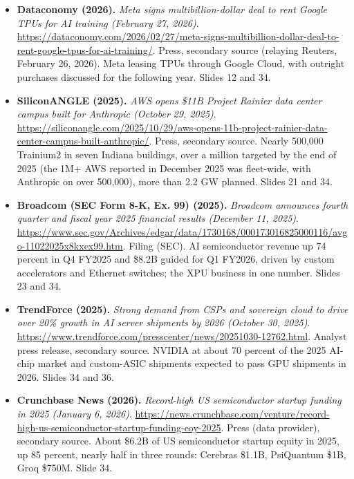 \documentclass[11pt,letterpaper]{article}
\begin{document}
\begin{itemize}[leftmargin=1.2em,itemsep=3pt]
\item \textbf{Dataconomy (2026).} \textit{Meta signs multibillion-dollar deal to rent Google TPUs for AI training (February 27, 2026)}. \url{https://dataconomy.com/2026/02/27/meta-signs-multibillion-dollar-deal-to-rent-google-tpus-for-ai-training/}. Press, secondary source (relaying Reuters, February 26, 2026). Meta leasing TPUs through Google Cloud, with outright purchases discussed for the following year. Slides 12 and 34.
\item \textbf{SiliconANGLE (2025).} \textit{AWS opens \$11B Project Rainier data center campus built for Anthropic (October 29, 2025)}. \url{https://siliconangle.com/2025/10/29/aws-opens-11b-project-rainier-data-center-campus-built-anthropic/}. Press, secondary source. Nearly 500,000 Trainium2 in seven Indiana buildings, over a million targeted by the end of 2025 (the 1M+ AWS reported in December 2025 was fleet-wide, with Anthropic on over 500,000), more than 2.2 GW planned. Slides 21 and 34.
\item \textbf{Broadcom (SEC Form 8-K, Ex. 99) (2025).} \textit{Broadcom announces fourth quarter and fiscal year 2025 financial results (December 11, 2025)}. \url{https://www.sec.gov/Archives/edgar/data/1730168/000173016825000116/avgo-11022025x8kxex99.htm}. Filing (SEC). AI semiconductor revenue up 74 percent in Q4 FY2025 and \$8.2B guided for Q1 FY2026, driven by custom accelerators and Ethernet switches; the XPU business in one number. Slides 23 and 34.
\item \textbf{TrendForce (2025).} \textit{Strong demand from CSPs and sovereign cloud to drive over 20\% growth in AI server shipments by 2026 (October 30, 2025)}. \url{https://www.trendforce.com/presscenter/news/20251030-12762.html}. Analyst press release, secondary source. NVIDIA at about 70 percent of the 2025 AI-chip market and custom-ASIC shipments expected to pass GPU shipments in 2026. Slides 34 and 36.
\item \textbf{Crunchbase News (2026).} \textit{Record-high US semiconductor startup funding in 2025 (January 6, 2026)}. \url{https://news.crunchbase.com/venture/record-high-us-semiconductor-startup-funding-eoy-2025}. Press (data provider), secondary source. About \$6.2B of US semiconductor startup equity in 2025, up 85 percent, nearly half in three rounds: Cerebras \$1.1B, PsiQuantum \$1B, Groq \$750M. Slide 34.
\end{itemize}
\end{document}
